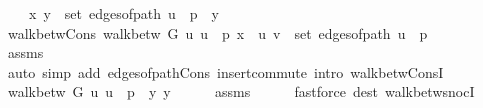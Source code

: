 \begin{isabellebody}
\ \ \ \ {\isachardoublequoteopen}{\isacharbraceleft}{\kern0pt}x{\isacharcomma}{\kern0pt}\ y{\isacharbraceright}{\kern0pt}\ {\isasymin}\ set\ {\isacharparenleft}{\kern0pt}edges{\isacharunderscore}{\kern0pt}of{\isacharunderscore}{\kern0pt}path\ {\isacharparenleft}{\kern0pt}u\ {\isacharhash}{\kern0pt}\ p\ {\isacharat}{\kern0pt}\ {\isacharbrackleft}{\kern0pt}y{\isacharbrackright}{\kern0pt}{\isacharparenright}{\kern0pt}{\isacharparenright}{\kern0pt}{\isachardoublequoteclose}\isanewline
%
\isadelimproof
%
\endisadelimproof
%
\isatagproof
{}\isamarkupfalse%
\ {\isacharminus}{\kern0pt}\isanewline
\ \ \isamarkupfalse%
\ walk{\isacharunderscore}{\kern0pt}betw{\isacharunderscore}{\kern0pt}Cons{\isacharcolon}{\kern0pt}\ {\isachardoublequoteopen}walk{\isacharunderscore}{\kern0pt}betw\ G\ u\ {\isacharparenleft}{\kern0pt}u\ {\isacharhash}{\kern0pt}\ p{\isacharparenright}{\kern0pt}\ x\ {\isasymand}\ {\isacharbraceleft}{\kern0pt}u{\isacharcomma}{\kern0pt}\ v{\isacharbraceright}{\kern0pt}\ {\isasymin}\ set\ {\isacharparenleft}{\kern0pt}edges{\isacharunderscore}{\kern0pt}of{\isacharunderscore}{\kern0pt}path\ {\isacharparenleft}{\kern0pt}u\ {\isacharhash}{\kern0pt}\ p{\isacharparenright}{\kern0pt}{\isacharparenright}{\kern0pt}{\isachardoublequoteclose}\isanewline
\ \ \ \ \isamarkupfalse%
\ assms{\isacharparenleft}{\kern0pt}{}{\isacharcomma}{\kern0pt}\ {}{\isacharparenright}{\kern0pt}\isanewline
\ \ \ \ \isamarkupfalse%
\ {\isacharparenleft}{\kern0pt}auto\ simp\ add{\isacharcolon}{\kern0pt}\ edges{\isacharunderscore}{\kern0pt}of{\isacharunderscore}{\kern0pt}path{\isacharunderscore}{\kern0pt}Cons\ insert{\isacharunderscore}{\kern0pt}commute\ intro{\isacharcolon}{\kern0pt}\ walk{\isacharunderscore}{\kern0pt}betw{\isacharunderscore}{\kern0pt}ConsI{\isacharparenright}{\kern0pt}\isanewline
\ \ \isamarkupfalse%
\ {\isachardoublequoteopen}walk{\isacharunderscore}{\kern0pt}betw\ G\ u\ {\isacharparenleft}{\kern0pt}u\ {\isacharhash}{\kern0pt}\ p\ {\isacharat}{\kern0pt}\ {\isacharbrackleft}{\kern0pt}y{\isacharbrackright}{\kern0pt}{\isacharparenright}{\kern0pt}\ y{\isachardoublequoteclose}\isanewline
\ \ \ \ \isamarkupfalse%
\ assms{\isacharparenleft}{\kern0pt}{}{\isacharparenright}{\kern0pt}\isanewline
\ \ \ \ \isamarkupfalse%
\ {\isacharparenleft}{\kern0pt}fastforce\ dest{\isacharcolon}{\kern0pt}\ walk{\isacharunderscore}{\kern0pt}betw{\isacharunderscore}{\kern0pt}snocI{\isacharparenright}{\kern0pt}\isanewline
\ \ \isamarkupfalse%

\end{isabellebody}

